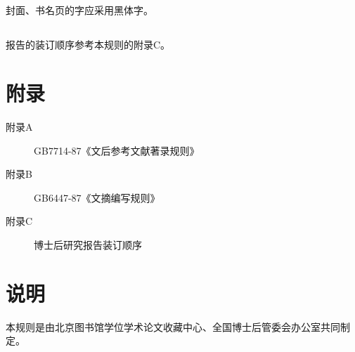 \subsection{}

封面、书名页的字应采用黑体字。


\subsection{}

报告的装订顺序参考本规则的附录C。


\section*{附录}

\begin{description}

\item[附录A] GB7714-87《文后参考文献著录规则》

\item[附录B] GB6447-87《文摘编写规则》

\item[附录C]  博士后研究报告装订顺序


\end{description}


\section*{说明}

本规则是由北京图书馆学位学术论文收藏中心、全国博士后管委会办公室共同制定。